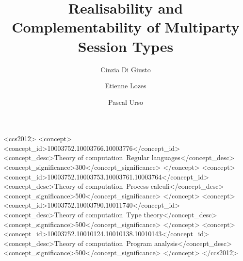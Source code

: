 \documentclass[sigplan,screen,review]{acmart}
\begin{document}
\theoremstyle{acmdefinition}
\newtheorem{remark}[theorem]{Remark}
\newtheorem{fact}[theorem]{Fact}

\title{Realisability and Complementability of Multiparty Session Types}


\author{Cinzia {Di Giusto}}

\author{Etienne Lozes }

\author{Pascal Urso }


	


\begin{abstract}
	
\end{abstract}

\begin{CCSXML}
<ccs2012>
<concept>
<concept_id>10003752.10003766.10003776</concept_id>
<concept_desc>Theory of computation~Regular languages</concept_desc>
<concept_significance>300</concept_significance>
</concept>
<concept>
<concept_id>10003752.10003753.10003761.10003764</concept_id>
<concept_desc>Theory of computation~Process calculi</concept_desc>
<concept_significance>500</concept_significance>
</concept>
<concept>
<concept_id>10003752.10003790.10011740</concept_id>
<concept_desc>Theory of computation~Type theory</concept_desc>
<concept_significance>500</concept_significance>
</concept>
<concept>
<concept_id>10003752.10010124.10010138.10010143</concept_id>
<concept_desc>Theory of computation~Program analysis</concept_desc>
<concept_significance>500</concept_significance>
</concept>
</ccs2012>
\end{CCSXML}
\end{document}

